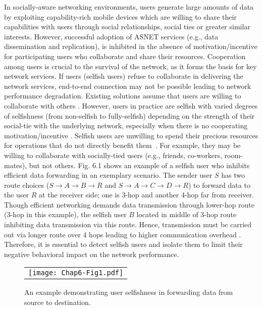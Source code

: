 In socially-aware networking environments, users generate large amounts of data by exploiting capability-rich mobile devices which are willing to share their capabilities with users through social relationships, social ties or greater similar interests. However, successful adoption of ASNET services (e.g., data dissemination and replication), is inhibited in the absence of motivation/incentive for participating users who collaborate and share their resources. Cooperation among users is crucial to the survival of the network, as it forms the basis for key network services. If  users (selfish users) refuse to collaborate in delivering the network services, end-to-end connection may not be possible leading to network performance degradation. Existing solutions assume that users are willing to collaborate with others \cite{MEirinaki2014}. However, users in practice are selfish with varied degrees of selfishness (from non-selfish to fully-selfish) depending on the strength of their social-tie with the underlying network, especially when there is no cooperating motivation/incentive \cite{QLi2010}. Selfish users are unwilling to spend their precious resources for operations that do not directly benefit them~\cite{KGopalakrishnan2009}. For example, they may be willing to collaborate with socially-tied users (e.g., friends, co-workers, room-mates), but not others. Fig. 6.1 shows an example of a selfish user who inhibits efficient data forwarding in an exemplary scenario. The sender user $S$ has two route choices ($S\rightarrow A\rightarrow B \rightarrow R$ and $S\rightarrow A \rightarrow C\rightarrow D\rightarrow R$) to forward data to the user $R$ at the receiver side; one is 3-hop and another 4-hop far from receiver. Though efficient networking demands data transmission through lower-hop route (3-hop in this example), the selfish user $B$ located in middle of 3-hop route inhibiting data transmission via this route. Hence, transmission must be carried out via longer route over 4 hops leading to higher communication overhead \cite{SAbolfazli2014}. Therefore, it is essential to detect selfish users and isolate them to limit their negative behavioral impact on the network performance.
\begin{figure}[t]
\begin{center}
  \begin{tabular}{c}
  \texttt{[image: Chap6-Fig1.pdf]}
  \end{tabular}
  \caption{An example demonstrating user selfishness in forwarding data from source to destination.}
\end{center}
\end{figure}

